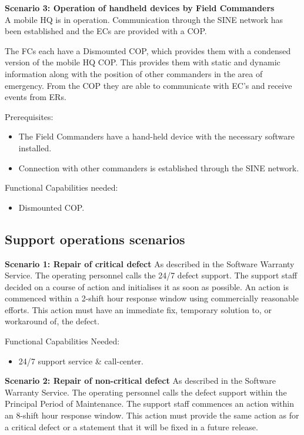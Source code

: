 \vspace{20pt}
\noindent \textbf{Scenario 3: Operation of handheld devices by Field Commanders} \\
A mobile HQ is in operation. Communication through the SINE network has been established and the ECs are provided with a COP. 

The FCs each have a Dismounted COP, which provides them with a condensed version of the mobile HQ COP. This provides them with static and dynamic information along with the position of other commanders in the area of emergency. From the COP they are able to communicate with EC's and receive events from ERs.

\noindent Prerequisites:
\begin{itemize}
	\itemsep0em
	\item The Field Commanders have a hand-held device with the necessary software installed.
	\item Connection with other commanders is  established through the SINE network.
\end{itemize}

\noindent Functional Capabilities needed:
\begin{itemize}
	\item Dismounted COP.
\end{itemize}

\subsection{Support operations scenarios}
\noindent \textbf{Scenario 1: Repair of critical defect}
As described in the Software Warranty Service.
The operating personnel calls the 24/7 defect support. The support staff decided on a course of action and initialises it as soon as possible. An action is commenced within a 2-shift hour response window using commercially reasonable efforts. This action must have an immediate fix, temporary solution to, or workaround of, the defect.

\noindent Functional Capabilities Needed:
\begin{itemize}
	\item 24/7 support service \& call-center.
\end{itemize}

\vspace{20pt}
\noindent \textbf{Scenario 2: Repair of non-critical defect}
As described in the Software Warranty Service.
The operating personnel calls the defect support within the Principal Period of Maintenance. The support staff commences an action within an 8-shift hour response window. This action must provide the same action as for a critical defect or a statement that it will be fixed in a future release. \\

